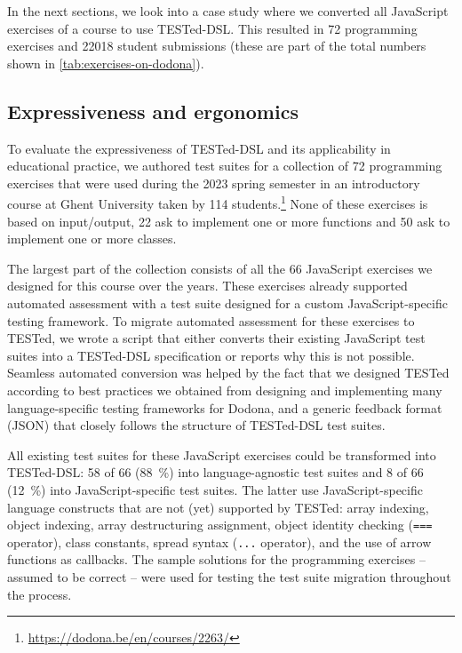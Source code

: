 \documentclass[../main]{subfiles}
\begin{document}
In the next sections, we look into a case study where we converted all JavaScript exercises of a course to use TESTed-DSL\@.
This resulted in \num{72} programming exercises and \num{22018} student submissions (these are part of the total numbers shown in \cref{tab:exercises-on-dodona}).

\subsection{Expressiveness and ergonomics}\label{subsec:dsl-expressiveness-and-ergonomics}

To evaluate the expressiveness of TESTed-DSL and its applicability in educational practice, we authored test suites for a collection of \num{72} programming exercises that were used during the 2023 spring semester in an introductory course at Ghent University taken by \num{114} students.\footnote{\url{https://dodona.be/en/courses/2263/}}
None of these exercises is based on input/output, \num{22} ask to implement one or more functions and \num{50} ask to implement one or more classes.

The largest part of the collection consists of all the \num{66} JavaScript exercises we designed for this course over the years.
These exercises already supported automated assessment with a test suite designed for a custom JavaScript-specific testing framework.
To migrate automated assessment for these exercises to TESTed, we wrote a script that either converts their existing JavaScript test suites into a TESTed-DSL specification or reports why this is not possible.
Seamless automated conversion was helped by the fact that we designed TESTed according to best practices we obtained from designing and implementing many language-specific testing frameworks for Dodona, and a generic feedback format (JSON) that closely follows the structure of TESTed-DSL test suites.

All existing test suites for these JavaScript exercises could be transformed into TESTed-DSL: \num{58} of \num{66} (\qty{88}{\percent}) into language-agnostic test suites and \num{8} of \num{66} (\qty{12}{\percent}) into JavaScript-specific test suites.
The latter use JavaScript-specific language constructs that are not (yet) supported by TESTed: array indexing, object indexing, array destructuring assignment, object identity checking (\texttt{===} operator), class constants, spread syntax (\texttt{...} operator), and the use of arrow functions as callbacks.
The sample solutions for the programming exercises -- assumed to be correct -- were used for testing the test suite migration throughout the process.
\end{document}
